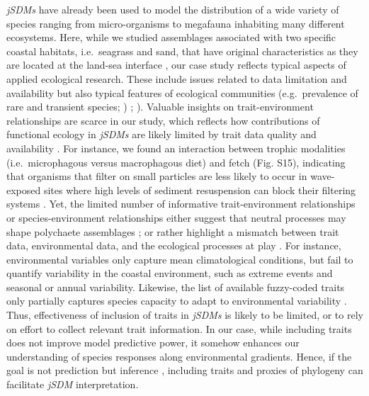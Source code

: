\begin{refsection}
\emph{jSDMs} have already been used to model the distribution of a wide
variety of species ranging from micro-organisms \autocite{Minard_2019}
to megafauna \autocite{Brimacombe_2020} inhabiting many different
ecosystems. Here, while we studied assemblages associated with two
specific coastal habitats, i.e.~seagrass and sand, that have original
characteristics as they are located at the land-sea interface
\autocite{Boye_2019a}, our case study reflects typical aspects of
applied ecological research. These include issues related to data
limitation and availability but also typical features of ecological
communities (e.g.~prevalence of rare and transient species;
\textcite{Magurran_2003}) ; \textcite{SnellTaylor_2018}). Valuable
insights on trait-environment relationships are scarce in our study,
which reflects how contributions of functional ecology in \emph{jSDMs}
are likely limited by trait data quality and availability \autocites[
]{Tyler_2012}{deJuan_2022}. For instance, we found an interaction
between trophic modalities (i.e.~microphagous versus macrophagous diet)
and fetch (Fig. S15), indicating that organisms that filter on small
particles are less likely to occur in wave-exposed sites where high
levels of sediment resuspension can block their filtering systems
\autocite{Manning_2014}. Yet, the limited number of informative
trait-environment relationships or species-environment relationships
either suggest that neutral processes may shape polychaete assemblages
\autocite{Boye_2019a}; or rather highlight a mismatch between trait
data, environmental data, and the ecological processes at play
\autocite{deJuan_2022}. For instance, environmental variables only
capture mean climatological conditions, but fail to quantify variability
in the coastal environment, such as extreme events and seasonal or
annual variability. Likewise, the list of available fuzzy-coded traits
only partially captures species capacity to adapt to environmental
variability \autocite{deJuan_2022}. Thus, effectiveness of inclusion of
traits in \emph{jSDMs} is likely to be limited, or to rely on effort to
collect relevant trait information. In our case, while including traits
does not improve model predictive power, it somehow enhances our
understanding of species responses along environmental gradients. Hence,
if the goal is not prediction but inference \autocite{Tredennick_2021},
including traits and proxies of phylogeny can facilitate \emph{jSDM}
interpretation.


\end{refsection}
